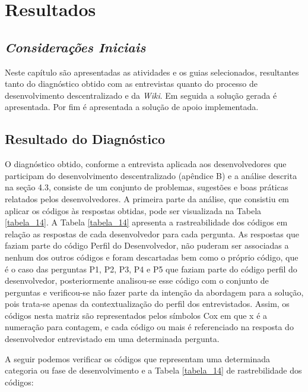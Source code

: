 \chapter[Resultados]{Resultados}

\section{\textit{Considerações Iniciais}}

Neste capítulo são apresentadas as atividades e os guias selecionados, resultantes tanto do diagnóstico obtido com as entrevistas quanto do processo de desenvolvimento descentralizado e da \textit{Wiki}. Em seguida a solução gerada é apresentada. Por fim é apresentada a solução de apoio implementada.

\section{Resultado do Diagnóstico}

O diagnóstico obtido, conforme a entrevista aplicada aos desenvolvedores que participam do desenvolvimento descentralizado (apêndice B) e a análise descrita na seção 4.3, consiste de um conjunto de problemas, sugestões e boas práticas relatados pelos desenvolvedores. A primeira parte da análise, que consistiu em aplicar os códigos às respostas obtidas, pode ser visualizada na Tabela \ref{tabela_14}. A Tabela \ref{tabela_14} apresenta a rastreabilidade dos códigos em relação as respostas de cada desenvolvedor para cada pergunta. As respostas que faziam parte do código Perfil do Desenvolvedor, não puderam ser associadas a nenhum dos outros códigos e foram descartadas bem como o próprio código, que é o caso das perguntas P1, P2, P3, P4 e P5 que faziam parte do código perfil do desenvolvedor, posteriormente analisou-se esse código com o conjunto de perguntas e verificou-se não fazer parte da intenção da abordagem para a solução, pois trata-se apenas da contextualização do perfil dos entrevistados. Assim, os códigos nesta matriz são representados pelos símbolos Cox em que x é a numeração para contagem, e cada código ou mais é referenciado na resposta do desenvolvedor entrevistado em uma determinada pergunta.

A seguir podemos verificar os códigos que representam uma determinada categoria ou fase de desenvolvimento e a Tabela \ref{tabela_14} de rastrebilidade dos códigos:

